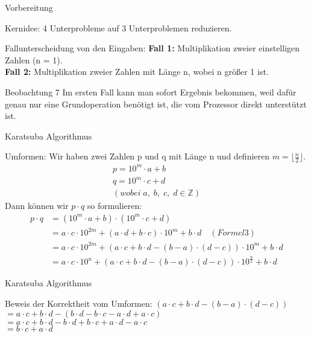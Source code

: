 \documentclass{beamer}
\begin{document}
\begin{frame}{Vorbereitung}
    \begin{block}{Kernidee:}
    4 Unterprobleme auf 3 Unterproblemen reduzieren.
    \end{block}
    
    \begin{block}{Fallunterscheidung von den Eingaben:}
    \textbf{Fall 1: }Multiplikation zweier einstelligen Zahlen (n = 1).\\
    \textbf{Fall 2: }Multiplikation zweier Zahlen mit Länge n, wobei n größer 1 ist.
    \end{block}
    
    \begin{block}{Beobachtung 7}
    Im ersten Fall kann man sofort Ergebnis bekommen, weil dafür genau nur eine Grundoperation benötigt ist, die vom Prozessor direkt unterstützt ist.
    \end{block}
\end{frame}

\begin{frame}{Karatsuba Algorithmus}
\begin{block}{Umformen:}
Wir haben zwei Zahlen p und q mit Länge n und definieren $m = \lfloor \frac{n}{2} \rfloor$.\\
\begin{align*}
        p = 10^{m} \cdot a + b\\
        q = 10^{m} \cdot c + d\\
        (wobei \;a, \;b, \;c, \;d \in \mathbb{Z})
    \end{align*}    
Dann können wir $p \cdot q$ so formulieren:  
\begin{align*}
p \cdot q &= (10^{m} \cdot a + b) \cdot (10^{m} \cdot c + d)\\
                 &= a \cdot c \cdot 10^{2m} + (a \cdot d + b \cdot c) \cdot 10^{m} + b \cdot d \quad (Formel 3)\\
				 &= a\cdot c\cdot 10^{2m} + (a \cdot c + b \cdot d - (b - a) \cdot (d - c)) \cdot 10^{m} + b \cdot d\\
				 &= a\cdot c\cdot 10^{n} + (a \cdot c + b \cdot d - (b - a) \cdot (d - c)) \cdot 10^{\frac{n}{2}} + b \cdot d
\end{align*}
\end{block}    
\end{frame}

\begin{frame}{Karatsuba Algorithmus}
    \begin{block}{Beweis der Korrektheit vom Umformen:}
$        (a \cdot c + b \cdot d - (b - a) \cdot (d - c))$\\
$= a \cdot c + b \cdot d - (b \cdot d - b \cdot c - a \cdot d + a \cdot c)$\\
$= a \cdot c + b \cdot d - b \cdot d + b \cdot c + a \cdot d - a \cdot c$\\
$= b \cdot c + a \cdot d $ 
    \end{block}
\end{frame}
\end{document}
